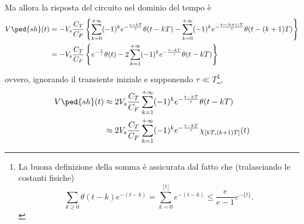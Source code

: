\documentclass[10pt,a4paper]{article}
\begin{document}
Ma allora la risposta del circuito nel dominio del tempo è
\begin{align*}
  V\ped{sh}(t) &= - V_s \frac{C_T}{C_F} \left\{ 
\sum_{k=0}^{+\infty} (-1)^{k}e^{-\frac{t - kT}{\tau}}\theta(t - kT) - 
\sum_{k=0}^{+\infty} (-1)^{k} e^{-\frac{t- (k+1) T }{\tau}} \theta(t - (k+1)T ) 
\right\} \\
               &= - V_s \frac{C_T}{C_F} \left\{ e^{-\frac{t}{\tau}} 
\theta(t) - 2 \sum_{k=1}^{+\infty} (-1)^{k} e^{-\frac{t - kT}{\tau}} \theta(t - 
kT) \right\}
\end{align*}
ovvero, ignorando il transiente iniziale e supponendo $ \tau\ll T $\footnote{
La buona definizione della somma è assicurata dal fatto che (tralasciando le 
costanti fisiche)
\[ \sum_{k \geq 0} \theta(t-k) e^{-(t-k)} = \sum_{k=0}^{\lfloor t \rfloor} 
e^{-(t-k)} \leq \frac{e}{e-1} e^{-\{t\}}. \]
},
\begin{align}\label{eq:Vshaper}
V\ped{sh}(t) &\approx 2 V_s \frac{C_T}{C_F} \sum_{k=1}^{+\infty} 
(-1)^{k} e^{-\frac{t - kT}{\tau}} \theta(t - kT) \nonumber\\
               &\approx  2 V_s \frac{C_T}{C_F} \sum_{k=1}^{+\infty} 
(-1)^{k} e^{-\frac{t - kT}{\tau}} \chi_{[kT, (k+1)T]}(t)
\end{align}
\end{document}
